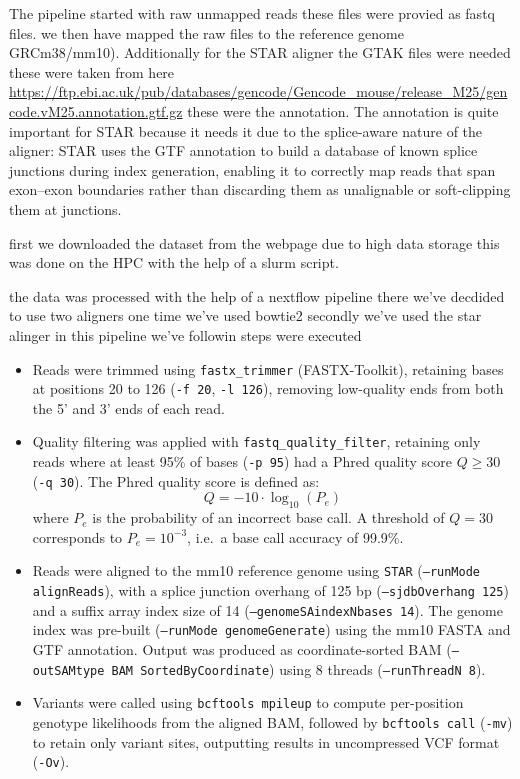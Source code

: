 The pipeline started with raw unmapped reads these files were provied as fastq files. we then have mapped the raw files to the reference genome GRCm38/mm10). 
Additionally for the STAR aligner the GTAK files were needed these were taken from here \url{https://ftp.ebi.ac.uk/pub/databases/gencode/Gencode_mouse/release_M25/gencode.vM25.annotation.gtf.gz} these were the annotation. 
The annotation is quite important for STAR because it needs it due to the splice-aware nature of the aligner: STAR uses the GTF annotation to build a database of known splice junctions during index generation, enabling it to correctly map reads that span exon–exon boundaries rather than discarding them as unalignable or soft-clipping them at junctions.

first we downloaded the dataset from the webpage due to high data storage this was done on the HPC with the help of a slurm script. 

the data was processed with the help of a nextflow pipeline there we've decdided to use two aligners one time we've used bowtie2 secondly we've used the star alinger 
in this pipeline we've followin steps were executed

\begin{itemize}
    \item Reads were trimmed using \texttt{fastx\_trimmer} (FASTX-Toolkit), retaining bases at positions 20 to 126 (\texttt{-f 20}, \texttt{-l 126}), removing low-quality ends from both the 5' and 3' ends of each read.
    
    \item Quality filtering was applied with \texttt{fastq\_quality\_filter}, retaining only reads where at least 95\% of bases (\texttt{-p 95}) had a Phred quality score $Q \geq 30$ (\texttt{-q 30}). The Phred quality score is defined as:
    \begin{equation}
        Q = -10 \cdot \log_{10}(P_e)
    \end{equation}
    where $P_e$ is the probability of an incorrect base call. A threshold of $Q = 30$ corresponds to $P_e = 10^{-3}$, i.e.\ a base call accuracy of 99.9\%.
    
    \item Reads were aligned to the mm10 reference genome using \texttt{STAR} (\texttt{--runMode alignReads}), with a splice junction overhang of 125 bp (\texttt{--sjdbOverhang 125}) and a suffix array index size of 14 (\texttt{--genomeSAindexNbases 14}). The genome index was pre-built (\texttt{--runMode genomeGenerate}) using the mm10 FASTA and GTF annotation. Output was produced as coordinate-sorted BAM (\texttt{--outSAMtype BAM SortedByCoordinate}) using 8 threads (\texttt{--runThreadN 8}).
    
    \item Variants were called using \texttt{bcftools mpileup} to compute per-position genotype likelihoods from the aligned BAM, followed by \texttt{bcftools call} (\texttt{-mv}) to retain only variant sites, outputting results in uncompressed VCF format (\texttt{-Ov}).
\end{itemize}

